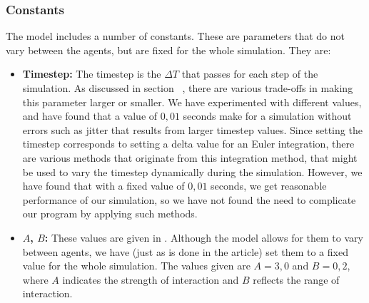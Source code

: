\subsubsection{Constants}
The model includes a number of constants. These are parameters that do not 
vary between the agents, but are fixed for the whole simulation. They are:

\begin{itemize}
    \item \textbf{Timestep:} The timestep is the $\Delta T$ that passes for 
        each step of the simulation. As discussed in 
        section~ %
		, there are various trade-offs in making 
        this parameter larger or smaller. We have experimented with different 
        values, and have found that a value of $0,01$ seconds make for a 
        simulation without errors such as jitter that results from larger 
        timestep values. Since setting the timestep corresponds to setting a 
        delta value for an Euler integration, there are various methods that 
        originate from this integration method, that might be used to vary the 
        timestep dynamically during the simulation. However, we have found 
        that with a fixed value of $0,01$ seconds, we get reasonable 
        performance of our simulation, so we have not found the need to 
        complicate our program by applying such methods.

    \item \textbf{$A$, $B$:} These values are given in \cite{ABconstant}. 
        Although the model allows for them to vary between agents, we have 
        (just as is done in the article) set them to a fixed value for the 
        whole simulation. The values given are $A=3,0$ and $B= 0,2$, where $ A $ indicates the strength of interaction and $ B $ reflects the range of interaction.
\end{itemize}



